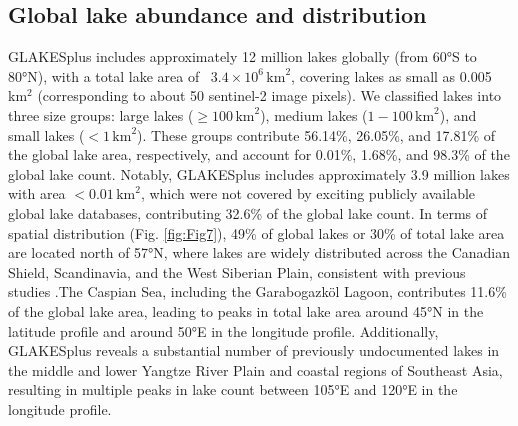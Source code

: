 \documentclass[preprint,12pt,authoryear]{elsarticle}
\begin{document}
\subsection{Global lake abundance and distribution}
\label{subsec32}

 GLAKESplus includes approximately 12 million lakes globally (from 60°S to 80°N), with a total lake area of ~$3.4 \times 10^6\, \text{km}^2$, covering lakes as small as 0.005 km$^2$ (corresponding to about 50 sentinel-2 image pixels). We classified lakes into three size groups: large lakes ($\ge 100\, \text{km}^2$), medium lakes ($1-100\, \text{km}^2$), and small lakes ($<1\,\text{km}^2$). These groups contribute 56.14\%, 26.05\%, and 17.81\% of the global lake area, respectively, and account for 0.01\%, 1.68\%, and 98.3\% of the global lake count. Notably, GLAKESplus includes approximately 3.9 million lakes with area $<0.01\, \text{km}^2$, which were not covered by exciting publicly available global lake databases, contributing 32.6\% of the global lake count. In terms of spatial distribution (Fig. \ref{fig:Fig7}), 49\% of global lakes or 30\% of total lake area are located north of 57°N, where lakes are widely distributed across the Canadian Shield, Scandinavia, and the West Siberian Plain, consistent with previous studies \citep{pi_mapping_2022,wang_surface_2025}.The Caspian Sea, including the Garabogazköl Lagoon, contributes 11.6\% of the global lake area, leading to peaks in total lake area around 45°N in the latitude profile and around 50°E in the longitude profile. Additionally, GLAKESplus reveals a substantial number of previously undocumented lakes in the middle and lower Yangtze River Plain and coastal regions of Southeast Asia, resulting in multiple peaks in lake count between 105°E and 120°E in the longitude profile.
\end{document}
